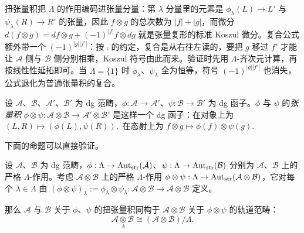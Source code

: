 \begin{yizhu}[扭张量积的符号与复合次序]
扭张量积把 $\Lambda$ 的作用编码进张量分量：第 $\lambda$ 分量里的元素是 $\phi_\lambda(L)\to L'$ 与 $\psi_\lambda(R)\to R'$ 的张量，因此 $f\otimes g$ 的总次数为 $|f|+|g|$，而微分 $d(f\otimes g)=df\otimes g+(-1)^{|f|}f\otimes dg$ 就是张量复形的标准 Koszul 微分。复合公式额外带一个 $(-1)^{|g||f'|}$：按 $\comp$ 的约定，复合是从右往左读的，要把 $g$ 移过 $f'$ 才能让 $\mathcal{A}$ 侧与 $\mathcal{B}$ 侧分别相乘，Koszul 符号由此而来。验证时先用 $\Lambda$-齐次元计算，再按线性性延拓即可。当 $\Lambda=\{1\}$ 时 $\phi_\lambda$、$\psi_\lambda$ 全为恒等，符号 $(-1)^{|g||f'|}$ 也消失，公式退化为普通张量积的复合。
\end{yizhu}

\begin{dfn}
设 $\mathcal{A}$、$\mathcal{B}$、$\mathcal{A}'$、$\mathcal{B}'$ 为 dg 范畴，$\phi:\mathcal{A}\rightarrow\mathcal{A}'$、$\psi:\mathcal{B}\rightarrow\mathcal{B}'$ 为 dg 函子。$\phi$ 与 $\psi$ 的\emph{张量积} $\phi\otimes\psi\colon\mathcal{A}\otimes\mathcal{B}\rightarrow\mathcal{A}'\otimes\mathcal{B}'$ 是这样一个 dg 函子：在对象上为
$
(L,R)\mapsto (\phi(L),\psi(R)),
$
在态射上为
$
f\otimes g \mapsto \phi(f)\otimes\psi(g).
$
\end{dfn}
下面的命题可以直接验证。
\begin{prp}\label{prp:twisted-tensor-equal-quotient}
设 $\mathcal{A}$、$\mathcal{B}$ 为 dg 范畴，$\phi:\Lambda\rightarrow\operatorname{Aut}_{\operatorname{\operatorname{str}}}(\mathcal{A})$、$\psi:\Lambda\rightarrow\operatorname{Aut}_{\operatorname{\operatorname{str}}}(\mathcal{B})$ 分别为 $\mathcal{A}$、$\mathcal{B}$ 上的严格 $\Lambda$-作用。考虑 $\mathcal{A}\otimes\mathcal{B}$ 上的严格 $\Lambda$-作用 $\phi\otimes \psi:\Lambda\rightarrow\operatorname{Aut}_{\operatorname{\operatorname{str}}}(\mathcal{A}\otimes\mathcal{B})$，它对每个 $\lambda\in\Lambda$ 由 $(\phi\otimes\psi)_{\lambda}:=\phi_{\lambda}\otimes \psi_{\lambda}\colon\mathcal{A}\otimes\mathcal{B}\rightarrow\mathcal{A}\otimes\mathcal{B}$ 定义。

那么 $\mathcal{A}$ 与 $\mathcal{B}$ 关于 $\phi$、$\psi$ 的扭张量积同构于 $\mathcal{A}\otimes\mathcal{B}$ 关于 $\phi\otimes\psi$ 的轨道范畴：
$$
\mathcal{A}\underset{\Lambda}{\otimes}\mathcal{B}
\cong
(\mathcal{A}\otimes\mathcal{B})/\Lambda.
$$
\end{prp}

